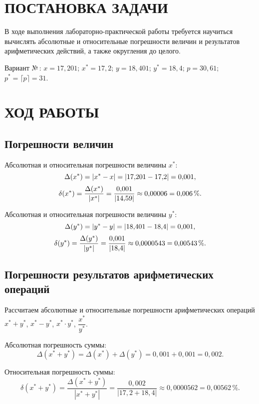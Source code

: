 \documentclass[14pt]{extarticle}
\begin{document}


\cfoot{\thepage}

\section{\MakeUppercase{Постановка задачи}}

В ходе выполнения лабораторно-практичес\-кой работы требуется научиться вычислять абсолютные и относительные погрешности величин и результатов арифметических действий, а также округления до целого.

Вариант №\,:
$x = 17{,}201$;
$x^* = 17{,}2$;
$y = 18{,}401$;
$y^* = 18{,}4$;
$p = 30{,}61$;
$p^* = \lceil p \rceil = 31$.


\newpage

\section{\MakeUppercase{Ход работы}}

\subsection{Погрешности величин}

Абсолютная и относительная погрешности величины $x^*$:
$$\Delta(x^*)
= |x^* - x|
= |17{,}201 - 17{,}2|
= \answer{1a}{0{,}001},$$
$$\delta(x^*)
= \frac{\Delta(x^*)}{|x^*|}
= \frac{0{,}001}{|14{,}59|}
\approx 0{,}00006
= \answer{1b}{0{,}006}\,\%.$$

Абсолютная и относительная погрешности величины $y^*$:
$$\Delta(y^*)
= |y^* - y|
= |18{,}401 - 18{,}4|
= \answer{2a}{0{,}001},$$
$$\delta(y^*)
= \frac{\Delta(y^*)}{|y^*|}
= \frac{0{,}001}{|18{,}4|}
\approx 0{,}0000543
= \answer{2b}{0{,}00543}\,\%.$$

\vspace{1.5em}\subsection{Погрешности результатов арифметических операций}

Рассчитаем абсолютные и относительные погрешности арифметических операций $x^* + y^*$, $x^* - y^*$, $x^* \cdot y^*$, $\dfrac{x^*}{y^*}$.

Абсолютная погрешность суммы:
$$\Delta(x^* + y^*)
= \Delta(x^*) + \Delta(y^*)
= 0{,}001 + 0{,}001
= 0{,}002.$$

Относительная погрешность суммы:
$$\delta(x^* + y^*)
= \frac{\Delta(x^* + y^*)}{|x^* + y^*|}
= \frac{0{,}002}{|17{,}2 + 18{,}4|}
\approx 0{,}0000562
= 0{,}00562\,\%.$$
\end{document}
